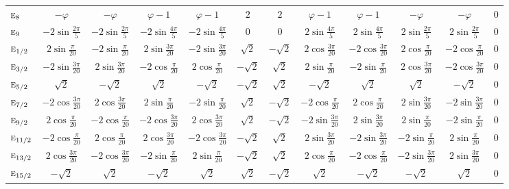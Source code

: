 \documentclass[10pt,a4paper]{article}
\makeatletter
\def\grouprule#1#2{\noalign{\marks\LTgroupmarks{\the\belowrulesep}\nobreak\vskip#1%
  \vskip\aboverulesep}\multispan\LT@cols\unskip{\leaders\hrule\@height#2\hfill\kern\z@}\cr
  \noalign{\penalty\LTrulebreak\vskip\belowrulesep\global\@lastruleclass\z@}}
\numberwithin{equation}{section}
\newcommand{\irr}[1]{\text{\normalfont\scshape #1}}
\newcommand{\goldenratio}{\varphi}
\makeatother
\begin{document}
{{\begin{longtable}{@{}lccccccccccc@{}}
$\irr{e}_{8}$ & $-\goldenratio{}$ & $-\goldenratio{}$ & $\goldenratio - 1$ & $\goldenratio - 1$ & $2$ & $2$ & $\goldenratio - 1$ & $\goldenratio - 1$ & $-\goldenratio{}$ & $-\goldenratio{}$ & $0$\\
$\irr{e}_{9}$ & $-2\sin\tfrac{2\pi}{5}$ & $-2\sin\tfrac{2\pi}{5}$ & $-2\sin\tfrac{4\pi}{5}$ & $-2\sin\tfrac{4\pi}{5}$ & $0$ & $0$ & $2\sin\tfrac{4\pi}{5}$ & $2\sin\tfrac{4\pi}{5}$ & $2\sin\tfrac{2\pi}{5}$ & $2\sin\tfrac{2\pi}{5}$ & $0$\\
\grouprule{0pt}{\lightrulewidth}
$\irr{e}_{1/2}$ & $2\sin\tfrac{\pi}{20}$ & $-2\sin\tfrac{\pi}{20}$ & $2\sin\tfrac{3\pi}{20}$ & $-2\sin\tfrac{3\pi}{20}$ & $\sqrt{2}$ & $-\sqrt{2}$ & $2\cos\tfrac{3\pi}{20}$ & $-2\cos\tfrac{3\pi}{20}$ & $2\cos\tfrac{\pi}{20}$ & $-2\cos\tfrac{\pi}{20}$ & $0$\\
$\irr{e}_{3/2}$ & $-2\sin\tfrac{3\pi}{20}$ & $2\sin\tfrac{3\pi}{20}$ & $-2\cos\tfrac{\pi}{20}$ & $2\cos\tfrac{\pi}{20}$ & $-\sqrt{2}$ & $\sqrt{2}$ & $2\sin\tfrac{\pi}{20}$ & $-2\sin\tfrac{\pi}{20}$ & $2\cos\tfrac{3\pi}{20}$ & $-2\cos\tfrac{3\pi}{20}$ & $0$\\
$\irr{e}_{5/2}$ & $\sqrt{2}$ & $-\sqrt{2}$ & $\sqrt{2}$ & $-\sqrt{2}$ & $-\sqrt{2}$ & $\sqrt{2}$ & $-\sqrt{2}$ & $\sqrt{2}$ & $\sqrt{2}$ & $-\sqrt{2}$ & $0$\\
$\irr{e}_{7/2}$ & $-2\cos\tfrac{3\pi}{20}$ & $2\cos\tfrac{3\pi}{20}$ & $2\sin\tfrac{\pi}{20}$ & $-2\sin\tfrac{\pi}{20}$ & $\sqrt{2}$ & $-\sqrt{2}$ & $-2\cos\tfrac{\pi}{20}$ & $2\cos\tfrac{\pi}{20}$ & $2\sin\tfrac{3\pi}{20}$ & $-2\sin\tfrac{3\pi}{20}$ & $0$\\
$\irr{e}_{9/2}$ & $2\cos\tfrac{\pi}{20}$ & $-2\cos\tfrac{\pi}{20}$ & $-2\cos\tfrac{3\pi}{20}$ & $2\cos\tfrac{3\pi}{20}$ & $\sqrt{2}$ & $-\sqrt{2}$ & $-2\sin\tfrac{3\pi}{20}$ & $2\sin\tfrac{3\pi}{20}$ & $2\sin\tfrac{\pi}{20}$ & $-2\sin\tfrac{\pi}{20}$ & $0$\\
$\irr{e}_{11/2}$ & $-2\cos\tfrac{\pi}{20}$ & $2\cos\tfrac{\pi}{20}$ & $2\cos\tfrac{3\pi}{20}$ & $-2\cos\tfrac{3\pi}{20}$ & $-\sqrt{2}$ & $\sqrt{2}$ & $2\sin\tfrac{3\pi}{20}$ & $-2\sin\tfrac{3\pi}{20}$ & $-2\sin\tfrac{\pi}{20}$ & $2\sin\tfrac{\pi}{20}$ & $0$\\
$\irr{e}_{13/2}$ & $2\cos\tfrac{3\pi}{20}$ & $-2\cos\tfrac{3\pi}{20}$ & $-2\sin\tfrac{\pi}{20}$ & $2\sin\tfrac{\pi}{20}$ & $-\sqrt{2}$ & $\sqrt{2}$ & $2\cos\tfrac{\pi}{20}$ & $-2\cos\tfrac{\pi}{20}$ & $-2\sin\tfrac{3\pi}{20}$ & $2\sin\tfrac{3\pi}{20}$ & $0$\\
$\irr{e}_{15/2}$ & $-\sqrt{2}$ & $\sqrt{2}$ & $-\sqrt{2}$ & $\sqrt{2}$ & $\sqrt{2}$ & $-\sqrt{2}$ & $\sqrt{2}$ & $-\sqrt{2}$ & $-\sqrt{2}$ & $\sqrt{2}$ & $0$\\

\end{longtable}}}
\end{document}
